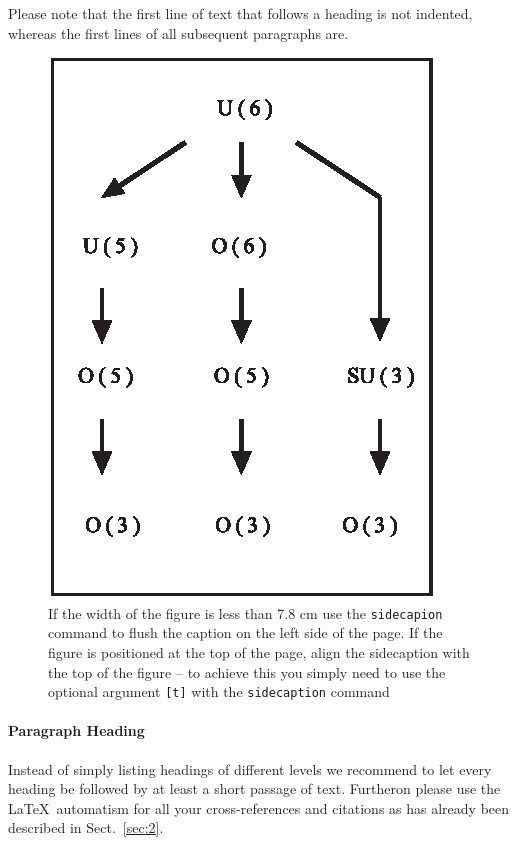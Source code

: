 Please note that the first line of text that follows a heading is not indented, whereas the first lines of all subsequent paragraphs are.

%
\begin{figure}[b]
\sidecaption
\includegraphics[scale=.65]{figure}
%
%
\caption{If the width of the figure is less than 7.8 cm use the \texttt{sidecapion} command to flush the caption on the left side of the page. If the figure is positioned at the top of the page, align the sidecaption with the top of the figure -- to achieve this you simply need to use the optional argument \texttt{[t]} with the \texttt{sidecaption} command}
\label{fig:1}       %
\end{figure}


\paragraph{Paragraph Heading} %
Instead of simply listing headings of different levels we recommend to let every heading be followed by at least a short passage of text. Furtheron please use the \LaTeX\ automatism for all your cross-references and citations as has already been described in Sect.~\ref{sec:2}.

